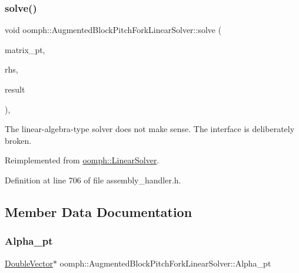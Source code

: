 \subsubsection{\texorpdfstring{solve()}{solve()}\hspace{0.1cm}{\footnotesize\ttfamily [3/3]}}
{\footnotesize\ttfamily void oomph\+::\+Augmented\+Block\+Pitch\+Fork\+Linear\+Solver\+::solve (\begin{DoxyParamCaption}\item[{\hyperlink{classoomph_1_1DoubleMatrixBase}{Double\+Matrix\+Base} $\ast$const \&}]{matrix\+\_\+pt,  }\item[{const \hyperlink{classoomph_1_1Vector}{Vector}$<$ double $>$ \&}]{rhs,  }\item[{\hyperlink{classoomph_1_1Vector}{Vector}$<$ double $>$ \&}]{result }\end{DoxyParamCaption})\hspace{0.3cm}{\ttfamily [inline]}, {\ttfamily [virtual]}}



The linear-\/algebra-\/type solver does not make sense. The interface is deliberately broken. 



Reimplemented from \hyperlink{classoomph_1_1LinearSolver_a1f7a2ee2cd18d3dafc20a61ca2f52dbb}{oomph\+::\+Linear\+Solver}.



Definition at line 706 of file assembly\+\_\+handler.\+h.



\subsection{Member Data Documentation}
\mbox{\label{classoomph_1_1AugmentedBlockPitchForkLinearSolver_a37d6d7eb053d062cabc6688f7c8fe240}} 
\subsubsection{\texorpdfstring{Alpha\+\_\+pt}{Alpha\_pt}}
{\footnotesize\ttfamily \hyperlink{classoomph_1_1DoubleVector}{Double\+Vector}$\ast$ oomph\+::\+Augmented\+Block\+Pitch\+Fork\+Linear\+Solver\+::\+Alpha\+\_\+pt\hspace{0.3cm}{\ttfamily [private]}}



